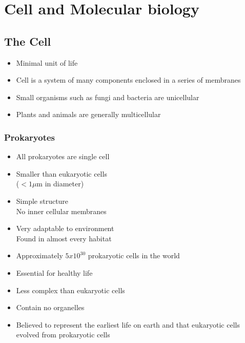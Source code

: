 \documentclass[a4paper]{article}
\begin{document}
\tableofcontents

\section{Cell and Molecular biology}

\subsection{The Cell}

\begin{itemize}
  \item Minimal unit of life
  \item Cell is a system of many components enclosed in a series of membranes
  \item Small organisms such as fungi and bacteria are unicellular
  \item Plants and animals are generally multicellular
\end{itemize}

\subsubsection{Prokaryotes}

\begin{itemize}
  \item All prokaryotes are single cell
  \item Smaller than eukaryotic cells \\
        ($< 1 \mu \mathrm{m}$ in diameter)
  \item Simple structure \\
        No inner cellular membranes
  \item Very adaptable to environment \\
        Found in almost every habitat
  \item Approximately $5x10^{30}$ prokaryotic cells in the world
  \item Essential for healthy life
\end{itemize}


\begin{itemize}
  \item Less complex than eukaryotic cells
  \item Contain no organelles
  \item Believed to represent the earliest life on earth and that eukaryotic
        cells evolved from prokaryotic cells
\end{itemize}
\end{document}
